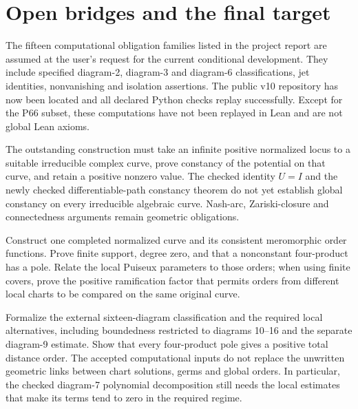 \chapter{Open bridges and the final target}

\begin{definition}
\label{bp:computational-inputs}
The fifteen computational obligation families listed in the project report
are assumed at the user's request for the current conditional development.
They include specified diagram-2, diagram-3 and diagram-6 classifications,
jet identities, nonvanishing and isolation assertions. The public v10 repository has now been located and all declared Python
checks replay successfully. Except for the P66 subset, these computations
have not been replayed in Lean and are not global Lean axioms.
\end{definition}

\begin{theorem}
\label{bp:curve-bridge}
\notready
The outstanding construction must take an infinite positive normalized locus
to a suitable irreducible complex curve, prove constancy of the potential on
that curve, and retain a positive nonzero value. The checked identity $U=I$
and the newly checked differentiable-path constancy theorem do not yet
establish global constancy on every irreducible algebraic curve. Nash-arc,
Zariski-closure and connectedness arguments remain geometric obligations.
\end{theorem}

\begin{theorem}
\label{bp:completion-bridge}
\notready
Construct one completed normalized curve and its consistent meromorphic order
functions. Prove finite support, degree zero, and that a nonconstant
four-product has a pole. Relate the local Puiseux parameters to those orders;
when using finite covers, prove the positive ramification factor that permits
orders from different local charts to be compared on the same original curve.
\end{theorem}

\begin{theorem}
\label{bp:local-bridge}
\notready
Formalize the external sixteen-diagram classification and the required local
alternatives, including boundedness restricted to diagrams 10--16 and the
separate diagram-9 estimate. Show that every four-product pole gives a positive
total distance order. The accepted computational inputs do not replace the
unwritten geometric links between chart solutions, germs and global orders.
In particular, the checked diagram-7 polynomial decomposition still needs
the local estimates that make its terms tend to zero in the required regime.
\end{theorem}

